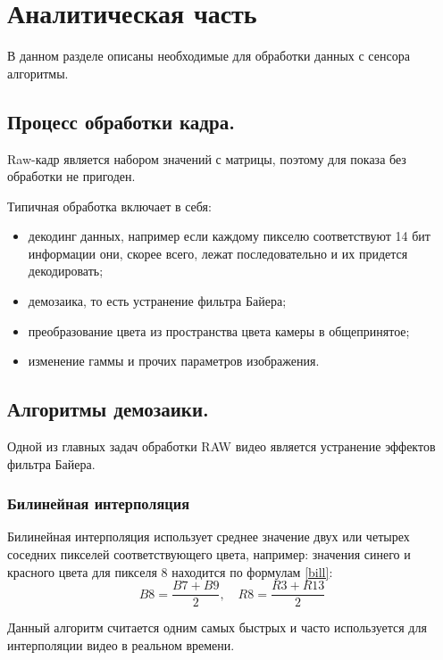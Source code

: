 \chapter{Аналитическая часть}

В данном разделе описаны необходимые для обработки данных с сенсора алгоритмы.

\section{Процесс обработки кадра.}

Raw-кадр является набором значений с матрицы, поэтому для показа без обработки не пригоден.

Типичная обработка включает в себя:
\begin{itemize}
	\item декодинг данных, например если каждому пикселю соответствуют 14 бит информации они, скорее всего, лежат последовательно и их придется декодировать;
	\item демозаика, то есть устранение фильтра Байера;
	\item преобразование цвета из пространства цвета камеры в общепринятое;
	\item изменение гаммы и прочих параметров изображения.
\end{itemize}

\section{Алгоритмы демозаики.}

Одной из главных задач обработки RAW видео является устранение эффектов фильтра Байера.


\subsection{Билинейная интерполяция}
Билинейная интерполяция использует среднее значение двух или четырех соседних пикселей соответствующего цвета, например: значения синего и красного цвета для пикселя 8 находится по формулам \ref{bill}:
\begin{equation}
	\label{bill}
	B8 = \frac{B7 + B9}{2},
	\quad	
	R8 = \frac{R3 + R13}{2}
\end{equation}

Данный алгоритм считается одним самых быстрых и часто используется для интерполяции видео в реальном времени.

